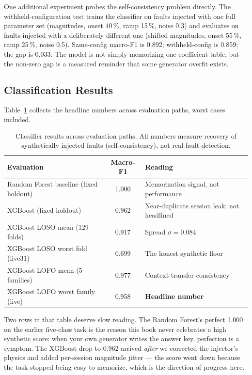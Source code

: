 One additional experiment probes the self-consistency problem directly.
The withheld-configuration test trains the classifier on faults injected
with one full parameter set (magnitudes, onset 40\,\%, ramp 15\,\%, noise
0.3) and evaluates on faults injected with a deliberately different one
(shifted magnitudes, onset 55\,\%, ramp 25\,\%, noise 0.5). Same-config
macro-F1 is 0.892; withheld-config is 0.859; the gap is 0.033. The model
is not simply memorizing one coefficient table, but the non-zero gap is a
measured reminder that some generator overfit exists.

\subsection{Classification Results}
\label{sec:classresults}

Table~\ref{tab:headline} collects the headline numbers across evaluation
paths, worst cases included.

\begin{table}[H]
  \centering
  \caption{Classifier results across evaluation paths. All numbers measure
    recovery of synthetically injected faults (self-consistency), not
    real-fault detection.}
  \label{tab:headline}
  \begin{tabular}{lcl}
    \toprule
    Evaluation & Macro-F1 & Reading\\
    \midrule
    Random Forest baseline (fixed holdout) & 1.000 & Memorization signal, not performance\\
    XGBoost (fixed holdout)                & 0.962 & Near-duplicate session leak; not headlined\\
    XGBoost LOSO mean (129 folds)          & 0.917 & Spread $\sigma = 0.084$\\
    XGBoost LOSO worst fold (live31)       & 0.699 & The honest synthetic floor\\
    XGBoost LOFO mean (5 families)         & 0.977 & Context-transfer consistency\\
    XGBoost LOFO worst family (live)       & 0.958 & \textbf{Headline number}\\
    \bottomrule
  \end{tabular}
\end{table}

Two rows in that table deserve slow reading. The Random Forest's perfect
1.000 on the earlier five-class task is the reason this book never
celebrates a high synthetic score: when your own generator writes the
answer key, perfection is a symptom. The XGBoost drop to 0.962 arrived
\emph{after} we corrected the injector's physics and added per-session
magnitude jitter --- the score went down because the task stopped being
easy to memorize, which is the direction of progress here.

